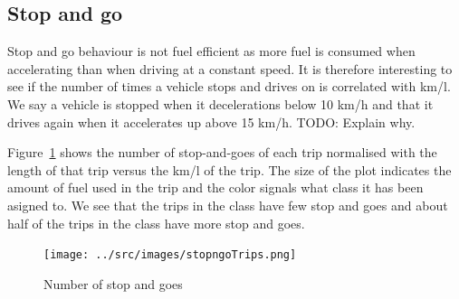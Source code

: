 \subsection{Stop and go}
Stop and go behaviour is not fuel efficient as more fuel is consumed when accelerating than when driving at a constant speed.
It is therefore interesting to see if the number of times a vehicle stops and drives on is correlated with km/l.
We say a vehicle is stopped when it decelerations below 10 km/h and that it drives again when it accelerates up above 15 km/h.
TODO: Explain why.


Figure~\ref{fig:stopngoTrips} shows the number of stop-and-goes of each trip normalised with the length of that trip versus the km/l of the trip.
The size of the plot indicates the amount of fuel used in the trip and the color signals what class it has been asigned to.
We see that the trips in the \fuelHigh class have few stop and goes and about half of the trips in the \fuelMedium class have more stop and goes.

\begin{figure}
\centering
\texttt{[image: ../src/images/stopngoTrips.png]}
\caption{Number of stop and goes}
\label{fig:stopngoTrips}
\end{figure}
